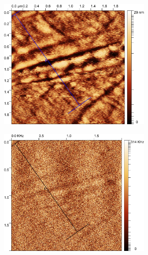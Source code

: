 \begin{figure}[H]
    \centering
    \begin{subfigure}[b]{0.45\textwidth}
        \centering
        \includegraphics[width = 0.8\textwidth]{figures/chap4/cdte-ag/afm-nsom-results/2um/CdTe_Ag_afm_profile_zone.jpg}
    \end{subfigure}\hfill
    \begin{subfigure}[b]{0.45\textwidth}
        \centering
        \includegraphics[width = 0.8\textwidth]{figures/chap4/cdte-ag/afm-nsom-results/2um/CdTe_Ag_nsom_profile_zone.jpg}
    \end{subfigure}


\end{figure}
